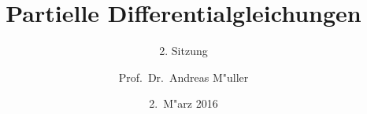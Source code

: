 \documentclass{beamer}
\title[]{Partielle Differentialgleichungen}
\subtitle{2. Sitzung}
\date[2.~M"arz 2016]{2.~M"arz 2016}
\author{Prof.~Dr.~Andreas M"uller}
\begin{document}
\begin{frame}
\titlepage
\end{frame}


\end{document}
